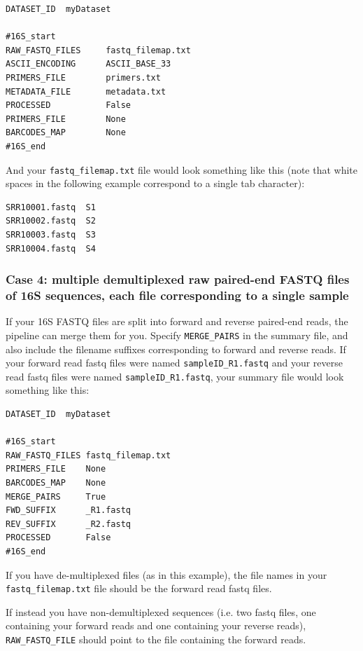 \documentclass[11pt, oneside]{article}   	%
\begin{document}
\begin{verbatim}
DATASET_ID	myDataset

#16S_start
RAW_FASTQ_FILES     fastq_filemap.txt
ASCII_ENCODING      ASCII_BASE_33
PRIMERS_FILE        primers.txt
METADATA_FILE       metadata.txt
PROCESSED           False
PRIMERS_FILE        None
BARCODES_MAP        None
#16S_end
\end{verbatim}

And your {\tt fastq\_filemap.txt} file would look something like this (note that white spaces in the following example correspond to a single tab character):

\begin{verbatim}
SRR10001.fastq	S1
SRR10002.fastq	S2
SRR10003.fastq	S3
SRR10004.fastq	S4
\end{verbatim}

\subsubsection{Case 4: multiple demultiplexed raw paired-end FASTQ files of 16S sequences, each file corresponding to a single sample}
If your 16S FASTQ files are split into forward and reverse paired-end reads, the pipeline can merge them for you. Specify {\tt MERGE\_PAIRS} in the summary file, and also include the filename suffixes corresponding to forward and reverse reads. If your forward read fastq files were named {\tt sampleID\_R1.fastq} and your reverse read fastq files were named {\tt sampleID\_R1.fastq}, your summary file would look something like this:

\begin{verbatim}
DATASET_ID	myDataset

#16S_start
RAW_FASTQ_FILES fastq_filemap.txt
PRIMERS_FILE    None
BARCODES_MAP    None
MERGE_PAIRS	    True
FWD_SUFFIX      _R1.fastq
REV_SUFFIX      _R2.fastq
PROCESSED       False
#16S_end
\end{verbatim}

If you have de-multiplexed files (as in this example), the file names in your 
{\tt fastq\_filemap.txt} file should be the forward read fastq files.

If instead you have non-demultiplexed sequences (i.e. two fastq files, one containing your
forward reads and one containing your reverse reads), {\tt RAW\_FASTQ\_FILE} should point
to the file containing the forward reads.
\end{document}
